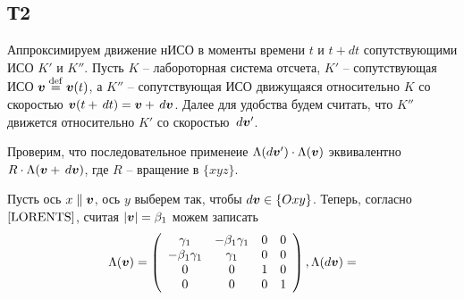 \subsection*{Т2}

Аппроксимируем движение нИСО в моменты времени $t$ и $t+dt$ сопутствующими ИСО $K'$ и $K''$. Пусть $K$ -- лабороторная система отсчета, $K'$ -- сопутствующая ИСО $\mbox{\boldmath $v$} \overset{\mathrm{def}}{=}  \mbox{\boldmath $v$}(t)$, а $K''$ -- сопутствующая ИСО движущаяся относительно $K$ со скоростью $\mbox{\boldmath $v$}(t + \, d t)  = \mbox{\boldmath $v$} + \, d \mbox{\boldmath $v$}$. Далее для удобства будем считать, что $K''$ движется относительно $K'$ со скоростью $\, d \mbox{\boldmath $v$}'$.

Проверим, что последовательное применеие $\Lambda(d \mbox{\boldmath $v$}') \cdot \Lambda(\mbox{\boldmath $v$})$ эквивалентно
$R \cdot \Lambda(\mbox{\boldmath $v$} + \, d \mbox{\boldmath $v$})$, где $R$ -- вращение в $\{xyz\}$.

Пусть ось $x \parallel \mbox{\boldmath $v$}$, ось $y$ выберем так, чтобы $d\mbox{\boldmath $v$} \in \{Oxy\}$. Теперь, согласно $\eqref{LORENTS}$, считая $|\mbox{\boldmath $v$}|=\beta_1$ можем записать
\begin{equation*}
    \Lambda(\mbox{\boldmath $v$}) =
    \left(
        \begin{array}{cccc}
         \gamma_1 & - \beta_1 \gamma_1 & 0 & 0 \\
         -\beta_1 \gamma_1 & \gamma_1 & 0 & 0 \\
         0 & 0 & 1 & 0 \\
         0 & 0 & 0 & 1 \\
        \end{array}
    \right),
    \Lambda(d \mbox{\boldmath $v$}) = 
\end{equation*}
